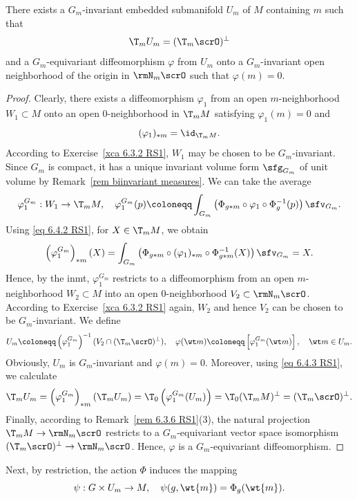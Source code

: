 \begin{lem}[{{\cite[Lem.~6.4.4]{RS1}}}]\label{lem 6.4.4 RS1}
    There exists a $G_m$-invariant embedded submanifold $U_m$ of $M$ containing $m$ such that 
    \[\T_mU_m=(\T_m\scrO)^\perp\]
    and a $G_m$-equivariant diffeomorphism $\varphi$ from $U_m$ onto a $G_m$-invariant open neighborhood of the origin in $\rmN_m\scrO$ such that $\varphi(m)=0$.
\end{lem}
\begin{proof}
    Clearly, there exists a diffeomorphism $\varphi_1$ from an open $m$-neighborhood $W_1\subset M$ onto an open $0$-neighborhood in $\T_m M$ satisfying $\varphi_1(m)=0$ and 
    \[(\varphi_1)_{\ast m}=\id_{\T_m M}.\label{eq 6.4.2 RS1}\] According to Exercise~\ref{xca 6.3.2 RS1}, $W_1$ may be chosen to be $G_m$-invariant. Since $G_m$ is compact, it has a unique invariant volume form $\sfg_{G_m}$ of unit volume by Remark~\ref{rem biinvariant measures}. We can take the average 
    \[\varphi_1^{G_m}:W_1\to \T_m M,\quad \varphi_1^{G_m}(p)\coloneqq \int_{G_m}\left(\Phi_{g\ast m}\circ \varphi_1\circ \Phi_{g}^{-1}(p)\right)\sfv_{G_m}.\]
    Using \eqref{eq 6.4.2 RS1}, for $X\in\T_m M$, we obtain 
    \[\left(\varphi_1^{G_m}\right)_{\ast m}(X)=\int_{G_m}\left(\Phi_{g\ast m}\circ (\varphi_1)_{\ast m}\circ \Phi_{g\ast m}^{-1}(X)\right)\sfv_{G_m}=X.\label{eq 6.4.3 RS1}\]
    Hence, by the \gls{inmt}, $\varphi_1^{G_m}$ restricts to a diffeomorphism from an open $m$-neighborhood $W_2\subset M$ into an open $0$-neighborhood $V_2\subset \rmN_m \scrO$. According to Exercise~\ref{xca 6.3.2 RS1} again, $W_2$ and hence $V_2$ can be chosen to be $G_m$-invariant. We define 
    \[U_m\coloneqq \left(\varphi_1^{G_m}\right)^{-1}(V_2\cap (\T_m \scrO)^{\perp}),\quad \varphi(\wt m)\coloneqq \left[\varphi_1^{G_m}(\wt m)\right],\quad \wt m\in U_m.\]
    Obviously, $U_m$ is $G_m$-invariant and $\varphi(m)=0$. Moreover, using \eqref{eq 6.4.3 RS1}, we calculate 
    \[\T_m U_m=\left(\varphi_1^{G_m}\right)_{\ast m}(\T_m U_m)=\T_0\left(\varphi_1^{G_m}(U_m)\right)=\T_0(\T_m M)^\perp=(\T_m \scrO)^\perp.\]
    Finally, according to Remark~\ref{rem 6.3.6 RS1}(3), the natural projection $\T_m M\to \rmN_m \scrO$ restricts to a $G_m$-equivariant vector space isomorphism $(\T_m \scrO)^\perp\to \rmN_m \scrO$. Hence, $\varphi$ is a $G_m$-equivariant diffeomorphism.
\end{proof}

Next, by restriction, the action $\Phi$ induces the mapping
\[\psi:G\times U_m\to M,\quad \psi(g,\wt{m})=\Phi_g(\wt{m}).\]


